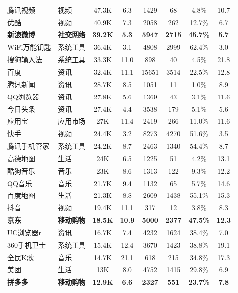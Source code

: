 \begin{ThreePartTable}
\begin{longtable}{l l c c c c c c}
\rowcolor{gray!15} 腾讯视频 & 视频 & 47.3K & 6.3 & 1429 & 68 & 4.8\% & 10.7 \\
优酷 & 视频 & 40.9K & 7.3 & 2058 & 262 & 12.7\% & 6.7 \\
{\bf 新浪微博}\tnote{*} & {\bf 社交网络} & {\bf 39.2K} & {\bf 5.3} & {\bf 5947} & {\bf 2715} & {\bf 45.7\%} & {\bf 5.7} \\
\rowcolor{gray!15} WiFi万能钥匙 & 系统工具 & 36.4K & 3.1 & 4808 & 2999 & 62.4\% & 3.0 \\
搜狗输入法 & 系统工具 & 33.3K & 11.0 & 898 & 40 & 4.5\% & 21.8 \\
\rowcolor{gray!15} 百度 & 资讯 & 32.4K & 11.1 & 15651 & 3514 & 22.5\% & 12.8 \\
腾讯新闻 & 资讯 & 28.7K & 8.5 & 1051 & 11 & 1.0\% & 8.9 \\
\rowcolor{gray!15} QQ浏览器 & 资讯 & 27.8K & 5.6 & 1369 & 43 & 3.1\% & 11.6 \\
今日头条 & 资讯 & 27.4K & 4.4 & 3538 & 179 & 5.1\% & 5.6 \\
\rowcolor{gray!15} 应用宝 & 应用市场 & 27K & 11.4 & 2419 & 266 & 11.0\% & 11.6 \\
快手 & 视频 & 24.4K & 3.2 & 8273 & 4270 & 51.6\% & 3.5 \\
\rowcolor{gray!15} 腾讯手机管家 & 系统工具 & 24.2K & 8.7 & 2463 & 1340 & 54.4\% & 8.7 \\
高德地图 & 生活 & 24K & 6.5 & 1225 & 51 & 4.2\% & 13.1 \\
\rowcolor{gray!15} 酷狗音乐 & 音乐 & 23K & 8.6 & 1313 & 122 & 9.3\% & 12.2 \\
QQ音乐 & 音乐 & 21.7K & 9.4 & 1132 & 65 & 5.7\% & 14.6 \\
\rowcolor{gray!15} 百度地图 & 生活 & 21.3K & 8.8 & 2609 & 1438 & 55.1\% & 15.3 \\
抖音 & 视频 & 19.4K & 11.1 & 317 & 12 & 3.8\% & 8.3 \\
\rowcolor{gray!15} {\bf 京东}\tnote{*} & {\bf 移动购物} & {\bf 18.5K} & {\bf 10.9} & {\bf 5000} & {\bf 2377} & {\bf 47.5\%} & {\bf 12.3} \\
UC浏览器r & 资讯 & 16.7K & 7.4 & 4232 & 1624 & 38.4\% & 7.0 \\
\rowcolor{gray!15} 360手机卫士 & 系统工具 & 15.4K & 12.4 & 3670 & 1423 & 38.8\% & 19.1 \\
全民K歌 & 音乐 & 14.7K & 21.1 & 618 & 215 & 34.8\% & 17.3 \\
\rowcolor{gray!15} 美团 & 生活 & 13K & 8.0 & 4752 & 1415 & 29.8\% & 6.9 \\
{\bf 拼多多}\tnote{*} & {\bf 移动购物} & {\bf 12.9K} & {\bf 6.6} & {\bf 2327} & {\bf 551} & {\bf 23.7\%} & {\bf 7.8} \\

\end{longtable}
\end{ThreePartTable}
